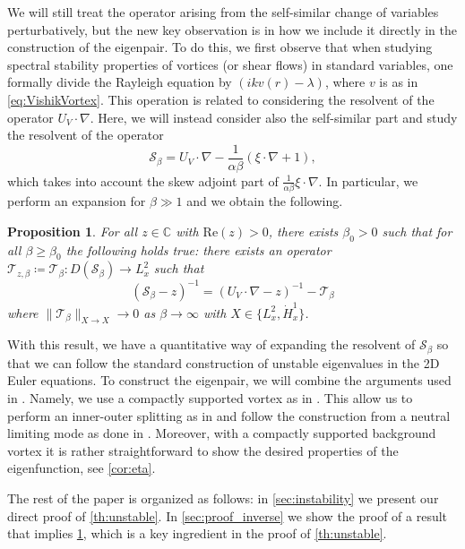 \documentclass[11pt,reqno]{amsproc}
\newtheorem{proposition}{Proposition}[section]
\theoremstyle{definition}
\theoremstyle{definition}
\numberwithin{equation}{section}
\begin{document}
We will still treat the operator arising from the self-similar change of variables perturbatively, but the new key observation is in how we include it directly in the construction of the eigenpair. To do this, we first observe that when studying spectral stability properties of vortices (or shear flows) in standard variables, one formally divide the Rayleigh equation by $(ik v(r)-\lambda)$, where $v$ is as in \cref{eq:VishikVortex}. This operation is related to considering the resolvent of the operator $U_V\cdot \nabla$. Here, we will instead consider also the self-similar part and study the resolvent of the operator 
\begin{equation}
\label{eq:calSbeta}
   \mathcal{S}_\beta= U_V\cdot \nabla -\frac{1}{\alpha \beta}(\xi \cdot \nabla +1),
\end{equation}
which takes into account the skew adjoint part of $\frac{1}{\alpha\beta}\xi\cdot \nabla$.
In particular, we perform an expansion for $\beta\gg1$ and we obtain the following.
\begin{proposition}
\label{th:resolvent}
For all $z\in \mathbb{C}$ with $\mathrm{Re}(z)>0$, there exists $\beta_0>0$ such that for all $\beta\geq \beta_0$ the following holds true: there exists an operator $\mathcal{T}_{z,\beta} \coloneqq \mathcal{T}_\beta :D(\mathcal{S}_\beta) \to L^2_x$ such that    \begin{equation}
        (\mathcal{S_\beta}-z)^{-1}=(U_V\cdot \nabla -z)^{-1}-\mathcal{T}_\beta
    \end{equation}
    where $\|\mathcal{T}_{\beta}\|_{X\to X}\to 0$ as $\beta \to \infty$ with $X\in \{L^2_x,\dot{H}^1_x\}$.
\end{proposition}
With this result, we have a quantitative way of expanding the resolvent of $\mathcal{S}_\beta$ so that we can follow the standard construction of unstable eigenvalues in the 2D Euler equations. To construct the eigenpair, we will combine the arguments used in \cite{vishik_notes,castro2024proof,kumar2023simple,albritton2023linear}. Namely, we use a compactly supported vortex as in \cite{castro2024proof}. This allow us to perform an inner-outer splitting as in \cite{kumar2023simple,albritton2023linear} and follow the construction from a neutral limiting mode as done in \cite{vishik_notes,kumar2023simple,lin2003instability}. Moreover, with a compactly supported background vortex it is rather straightforward to show the desired properties of the eigenfunction, see \cref{cor:eta}.

\medskip 

The rest of the paper is organized as follows: in 
 \cref{sec:instability} we present our direct proof of \cref{th:unstable}. In \cref{sec:proof_inverse} we show the proof of a result that implies \cref{th:resolvent}, which is a key ingredient in the proof of \cref{th:unstable}.
\end{document}
